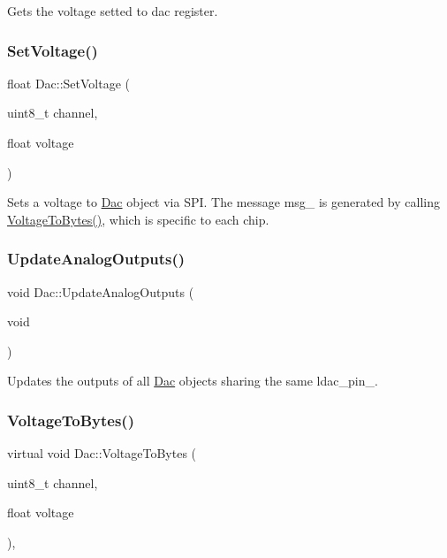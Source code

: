 Gets the voltage setted to dac register. \mbox{\label{classDac_a004482673b235eddc8100befac4a6833}} 
\subsubsection{\texorpdfstring{Set\+Voltage()}{SetVoltage()}}
{\footnotesize\ttfamily float Dac\+::\+Set\+Voltage (\begin{DoxyParamCaption}\item[{uint8\+\_\+t}]{channel,  }\item[{float}]{voltage }\end{DoxyParamCaption})}

Sets a voltage to \mbox{\hyperlink{classDac}{Dac}} object via S\+PI. The message msg\+\_\+ is generated by calling \mbox{\hyperlink{classDac_af5e882c87d38e1580d1b046ffd9effa0}{Voltage\+To\+Bytes()}}, which is specific to each chip. \mbox{\label{classDac_aafef1707ec33a2166a69e9b646cd471b}} 
\subsubsection{\texorpdfstring{Update\+Analog\+Outputs()}{UpdateAnalogOutputs()}}
{\footnotesize\ttfamily void Dac\+::\+Update\+Analog\+Outputs (\begin{DoxyParamCaption}\item[{void}]{ }\end{DoxyParamCaption})}

Updates the outputs of all \mbox{\hyperlink{classDac}{Dac}} objects sharing the same ldac\+\_\+pin\+\_\+. \mbox{\label{classDac_af5e882c87d38e1580d1b046ffd9effa0}} 
\subsubsection{\texorpdfstring{Voltage\+To\+Bytes()}{VoltageToBytes()}}
{\footnotesize\ttfamily virtual void Dac\+::\+Voltage\+To\+Bytes (\begin{DoxyParamCaption}\item[{uint8\+\_\+t}]{channel,  }\item[{float}]{voltage }\end{DoxyParamCaption})\hspace{0.3cm}{\ttfamily [protected]}, {}}

